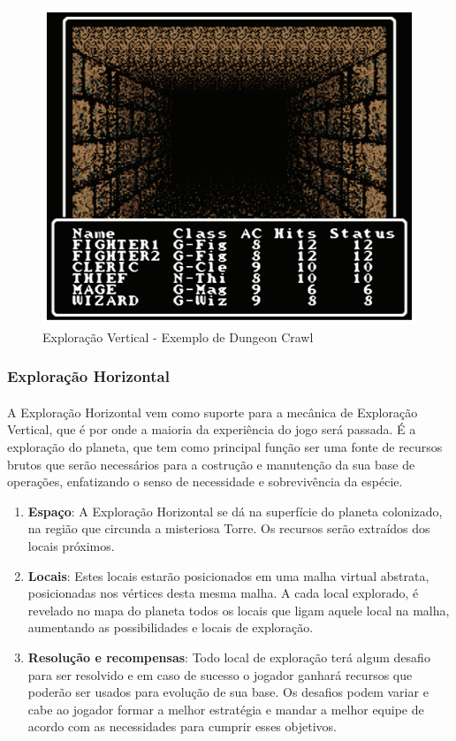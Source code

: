 \documentclass[11pt]{article} %
\begin{document}
\begin{figure}[!htp]
\centering
\includegraphics[scale=0.3]{res/Dungeon_Crawler.png}
\caption{Exploração Vertical - Exemplo de Dungeon Crawl}
\label{Dungeon Crawler}
\end{figure}

\subsubsection{Exploração Horizontal}
\paragraph{}A Exploração Horizontal vem como suporte para a mecânica de Exploração Vertical, que é por onde a maioria da experiência do jogo será passada. É a exploração do planeta, que tem como principal função ser uma fonte de recursos brutos que serão necessários para a costrução e manutenção da sua base de operações, enfatizando o senso de necessidade e sobrevivência da espécie.

\begin{enumerate}
  \item \textbf{Espaço}: A Exploração Horizontal se dá na superfície do planeta colonizado, na região que circunda a misteriosa Torre. Os recursos serão extraídos dos locais próximos.
  \item \textbf{Locais}: Estes locais estarão posicionados em uma malha virtual abstrata, posicionadas nos vértices desta mesma malha. A cada local explorado, é revelado no mapa do planeta todos os locais que ligam aquele local na malha, aumentando as possibilidades e locais de exploração.
  \item \textbf{Resolução e recompensas}: Todo local de exploração terá algum desafio para ser resolvido e em caso de sucesso o jogador ganhará recursos que poderão ser usados para evolução de sua base. Os desafios podem variar e cabe ao jogador formar a melhor estratégia e mandar a melhor equipe de acordo com as necessidades para cumprir esses objetivos.
\end{enumerate}
\end{document}
